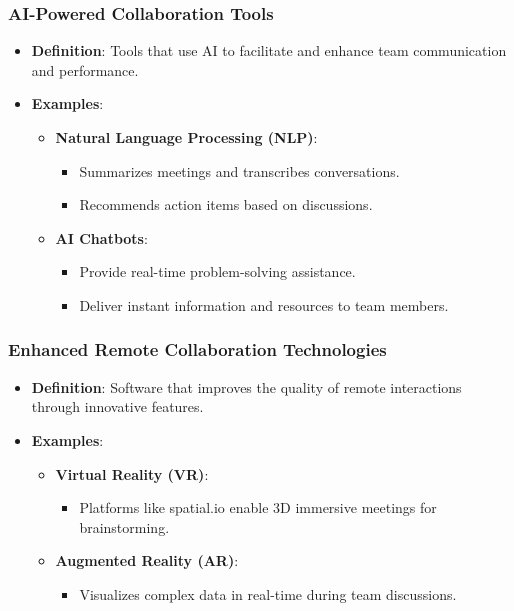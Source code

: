 \documentclass[aspectratio=169]{beamer}
\begin{document}
\begin{frame}[fragile]
    \frametitle{AI-Powered Collaboration Tools}
    \begin{itemize}
        \item \textbf{Definition}: Tools that use AI to facilitate and enhance team communication and performance.
        \item \textbf{Examples}:
            \begin{itemize}
                \item \textbf{Natural Language Processing (NLP)}: 
                \begin{itemize}
                    \item Summarizes meetings and transcribes conversations.
                    \item Recommends action items based on discussions.
                \end{itemize}
                \item \textbf{AI Chatbots}: 
                \begin{itemize}
                    \item Provide real-time problem-solving assistance.
                    \item Deliver instant information and resources to team members.
                \end{itemize}
            \end{itemize}
    \end{itemize}
\end{frame}

\begin{frame}[fragile]
    \frametitle{Enhanced Remote Collaboration Technologies}
    \begin{itemize}
        \item \textbf{Definition}: Software that improves the quality of remote interactions through innovative features.
        \item \textbf{Examples}:
            \begin{itemize}
                \item \textbf{Virtual Reality (VR)}: 
                \begin{itemize}
                    \item Platforms like spatial.io enable 3D immersive meetings for brainstorming.
                \end{itemize}
                \item \textbf{Augmented Reality (AR)}: 
                \begin{itemize}
                    \item Visualizes complex data in real-time during team discussions.
                \end{itemize}
            \end{itemize}
    \end{itemize}
\end{frame}
\end{document}
